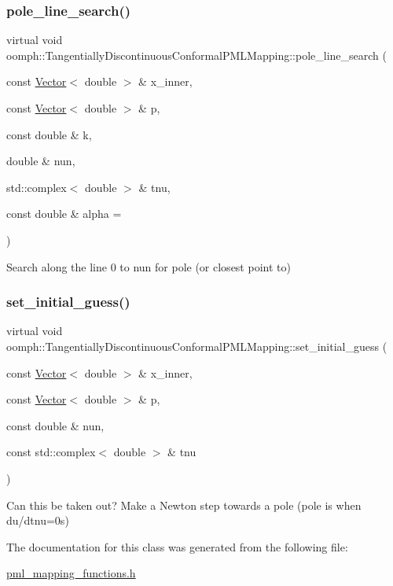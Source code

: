\subsubsection{\texorpdfstring{pole\+\_\+line\+\_\+search()}{pole\_line\_search()}}
{\footnotesize\ttfamily virtual void oomph\+::\+Tangentially\+Discontinuous\+Conformal\+P\+M\+L\+Mapping\+::pole\+\_\+line\+\_\+search (\begin{DoxyParamCaption}\item[{const \hyperlink{classoomph_1_1Vector}{Vector}$<$ double $>$ \&}]{x\+\_\+inner,  }\item[{const \hyperlink{classoomph_1_1Vector}{Vector}$<$ double $>$ \&}]{p,  }\item[{const double \&}]{k,  }\item[{double \&}]{nun,  }\item[{std\+::complex$<$ double $>$ \&}]{tnu,  }\item[{const double \&}]{alpha = {} }\end{DoxyParamCaption})\hspace{0.3cm}{\ttfamily [pure virtual]}}



Search along the line 0 to nun for pole (or closest point to) 

\mbox{\label{classoomph_1_1TangentiallyDiscontinuousConformalPMLMapping_aedd395353a762c78bea667920c57956c}} 
\subsubsection{\texorpdfstring{set\+\_\+initial\+\_\+guess()}{set\_initial\_guess()}}
{\footnotesize\ttfamily virtual void oomph\+::\+Tangentially\+Discontinuous\+Conformal\+P\+M\+L\+Mapping\+::set\+\_\+initial\+\_\+guess (\begin{DoxyParamCaption}\item[{const \hyperlink{classoomph_1_1Vector}{Vector}$<$ double $>$ \&}]{x\+\_\+inner,  }\item[{const \hyperlink{classoomph_1_1Vector}{Vector}$<$ double $>$ \&}]{p,  }\item[{const double \&}]{nun,  }\item[{const std\+::complex$<$ double $>$ \&}]{tnu }\end{DoxyParamCaption})\hspace{0.3cm}{\ttfamily [pure virtual]}}

Can this be taken out? Make a Newton step towards a pole (pole is when du/dtnu=0s) 

The documentation for this class was generated from the following file\+:\begin{DoxyCompactItemize}
\item 
\hyperlink{pml__mapping__functions_8h}{pml\+\_\+mapping\+\_\+functions.\+h}\end{DoxyCompactItemize}
